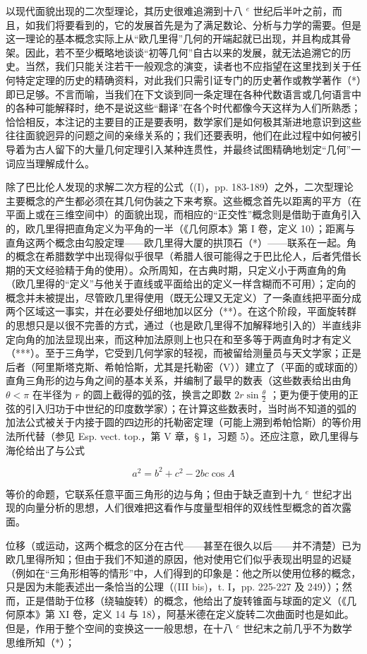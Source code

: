 以现代面貌出现的二次型理论，其历史很难追溯到十八 \(^{e}\) 世纪后半叶之前，而且，如我们将要看到的，它的发展首先是为了满足数论、分析与力学的需要。但是这一理论的基本概念实际上从“欧几里得”几何的开端起就已出现，并且构成其骨架。因此，若不至少概略地谈谈“初等几何”自古以来的发展，就无法追溯它的历史。当然，我们只能关注若干一般观念的演变，读者也不应指望在这里找到关于任何特定定理的历史的精确资料，对此我们只需引证专门的历史著作或教学著作（*）即已足够。不言而喻，当我们在下文谈到同一条定理在各种代数语言或几何语言中的各种可能解释时，绝不是说这些“翻译”在各个时代都像今天这样为人们所熟悉；恰恰相反，本注记的主要目的正是要表明，数学家们是如何极其渐进地意识到这些往往面貌迥异的问题之间的亲缘关系的；我们还要表明，他们在此过程中如何被引导着为古人留下的大量几何定理引入某种连贯性，并最终试图精确地划定“几何”一词应当理解成什么。

除了巴比伦人发现的求解二次方程的公式（(I)，pp. 183-189）之外，二次型理论主要概念的产生都必须在其几何伪装之下来考察。这些概念首先以距离的平方（在平面上或在三维空间中）的面貌出现，而相应的“正交性”概念则是借助于直角引入的，欧几里得把直角定义为平角的一半（《几何原本》第 I 卷，定义 10）；距离与直角这两个概念由勾股定理——欧几里得大厦的拱顶石（*）——联系在一起。角的概念在希腊数学中出现得似乎很早（希腊人很可能得之于巴比伦人，后者凭借长期的天文经验精于角的使用）。众所周知，在古典时期，只定义小于两直角的角（欧几里得的“定义”与他关于直线或平面给出的定义一样含糊而不可用）；定向的概念并未被提出，尽管欧几里得使用（既无公理又无定义）了一条直线把平面分成两个区域这一事实，并在必要处仔细地加以区分（**）。在这个阶段，平面旋转群的思想只是以很不完善的方式，通过（也是欧几里得不加解释地引入的）半直线非定向角的加法显现出来，而这种加法原则上也只在和至多等于两直角时才有定义（***）。至于三角学，它受到几何学家的轻视，而被留给测量员与天文学家；正是后者（阿里斯塔克斯、希帕恰斯，尤其是托勒密（V））建立了（平面的或球面的）直角三角形的边与角之间的基本关系，并编制了最早的数表（这些数表给出由角 \(\theta < \pi\) 在半径为 \(r\) 的圆上截得的弧的弦，换言之即数 \(2r \sin \frac{\theta}{2}\) ；更为便于使用的正弦的引入归功于中世纪的印度数学家）；在计算这些数表时，当时尚不知道的弧的加法公式被关于内接于圆的四边形的托勒密定理（可能上溯到希帕恰斯）的等价用法所代替（参见 Esp. vect. top.，第 V 章，§ 1，习题 5）。还应注意，欧几里得与海伦给出了与公式

\[
a ^ {2} = b ^ {2} + c ^ {2} - 2 b c \cos A
\]

等价的命题，它联系任意平面三角形的边与角；但由于缺乏直到十九 \(^{e}\) 世纪才出现的向量分析的思想，人们很难把这看作与度量型相伴的双线性型概念的首次露面。

位移（或运动，这两个概念的区分在古代——甚至在很久以后——并不清楚）已为欧几里得所知；但由于我们不知道的原因，他对使用它们似乎表现出明显的迟疑（例如在“三角形相等的情形”中，人们得到的印象是：他之所以使用位移的概念，只是因为未能表述出一条恰当的公理（(III bis)，t. I，pp. 225-227 及 249））；然而，正是借助于位移（绕轴旋转）的概念，他给出了旋转锥面与球面的定义（《几何原本》第 XI 卷，定义 14 与 18），阿基米德在定义旋转二次曲面时也是如此。但是，作用于整个空间的变换这一一般思想，在十八 \(^{e}\) 世纪末之前几乎不为数学思维所知（*）；


